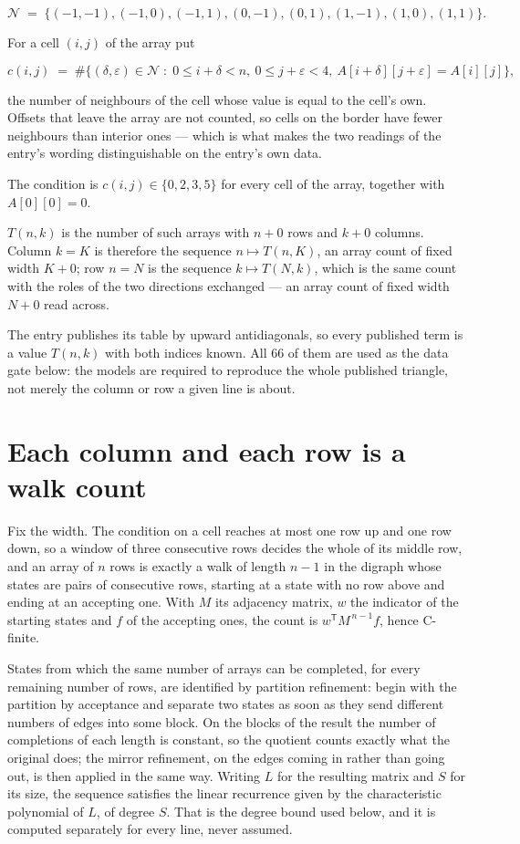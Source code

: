 \documentclass[11pt]{article}
\theoremstyle{definition}
\begin{document}
\[\mathcal{N} \;=\; \{(-1,-1), (-1,0), (-1,1), (0,-1), (0,1), (1,-1), (1,0), (1,1)\}.\]

For a cell $(i,j)$ of the array put

\[c(i,j) \;=\; \#\bigl\{(\delta,\varepsilon)\in\mathcal{N} \;:\; 0\le i+\delta<n,\ 0\le j+\varepsilon<4,\ A[i+\delta][j+\varepsilon] = A[i][j]\bigr\},\]

the number of neighbours of the cell whose value is equal to the cell's own. Offsets that leave the array are not counted, so cells on the border have fewer neighbours than interior ones --- which is what makes the two readings of the entry's wording distinguishable on the entry's own data.

The condition is $c(i,j) \in \{0, 2, 3, 5\}$ for every cell of the array, together with $A[0][0]=0$.

$T(n,k)$ is the number of such arrays with $n + 0$ rows and $k + 0$ columns. Column $k = K$ is therefore the sequence $n \mapsto T(n,K)$, an array count of fixed width $K + 0$; row $n = N$ is the sequence $k \mapsto T(N,k)$, which is the same count with the roles of the two directions exchanged --- an array count of fixed width $N + 0$ read across.

The entry publishes its table by upward antidiagonals, so every published term is a value $T(n,k)$ with both indices known. All 66 of them are used as the data gate below: the models are required to reproduce the whole published triangle, not merely the column or row a given line is about.

\section{Each column and each row is a walk count}

Fix the width. The condition on a cell reaches at most one row up and one row down, so a window of three consecutive rows decides the whole of its middle row, and an array of $n$ rows is exactly a walk of length $n-1$ in the digraph whose states are pairs of consecutive rows, starting at a state with no row above and ending at an accepting one. With $M$ its adjacency matrix, $w$ the indicator of the starting states and $f$ of the accepting ones, the count is $w^{\mathsf T}M^{\,n-1}f$, hence C-finite.

States from which the same number of arrays can be completed, for every remaining number of rows, are identified by partition refinement: begin with the partition by acceptance and separate two states as soon as they send different numbers of edges into some block. On the blocks of the result the number of completions of each length is constant, so the quotient counts exactly what the original does; the mirror refinement, on the edges coming in rather than going out, is then applied in the same way. Writing $L$ for the resulting matrix and $S$ for its size, the sequence satisfies the linear recurrence given by the characteristic polynomial of $L$, of degree $S$. That is the degree bound used below, and it is computed separately for every line, never assumed.
\end{document}
